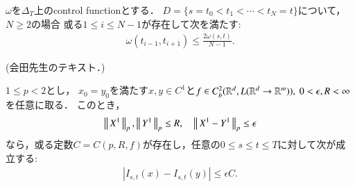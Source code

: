 	\begin{comment}
		\begin{align}
			&\omega_1(s,u)\omega_2(s,u) + \omega_1(u,t)\omega_2(u,t) \\
			&= \left\{ \omega_1(s,u) + \omega_1(u,t) \right\}\omega_2(s,u) + \omega_1(u,t)\left\{\omega_2(u,t) - \omega_2(s,u)\right\} \\
			&\leq \omega_1(s,t)\omega_2(s,u) + \omega_1(u,t)\left\{\omega_2(u,t) - \omega_2(s,u)\right\} \\
			&\leq \omega_1(s,t)\omega_2(s,u) + \omega_1(u,t)\omega_2(u,t) \\
			&\leq \omega_1(s,t)\left\{ \omega_2(s,u) + \omega_2(u,t)\right\} \\
			&\leq \omega_1(s,t)\omega_2(s,t)
		\end{align}
	\end{comment}
	
	\begin{screen}
		\begin{lem}\label{lem:control_function_min}
			$\omega$を$\Delta_T$上のcontrol functionとする．
			$D = \{s = t_0 < t_1 < \cdots < t_N= t\}$について，$N \geq 2$の場合
			或る$1 \leq i \leq N-1$が存在して次を満たす:
			\begin{align}
				\omega(t_{i-1},t_{i+1})
				\leq \frac{2 \omega(s,t)}{N-1}.
				\label{eq:lem_control_function_min}
			\end{align}
		\end{lem}
	\end{screen}
	
	\begin{prf}
		(会田先生のテキスト．)
		\QED
	\end{prf}
	
	\begin{screen}
		\begin{thm}\label{thm:continuity_theorem_1}
			$1 \leq p < 2$とし，
			$x_0 = y_0$を満たす$x,y \in C^1$と$f \in C^2_b(\mathbb{R}^d,L(\mathbb{R}^d \rightarrow \mathbb{R}^m)),\ 0 < \epsilon, R < \infty$を任意に取る．
			このとき，
			\begin{align}
				\left\|\, X^1\, \right\|_{p},\left\|\, Y^1\, \right\|_{p} \leq R,
				\quad \left\|\, X^1 - Y^1\, \right\|_{p} \leq \epsilon
			\end{align}
			なら，或る定数$C = C(p,R,f)$が存在し，任意の$0 \leq s \leq t \leq T$に対して次が成立する:
			\begin{align}
				\left| I_{s,t}(x) - I_{s,t}(y) \right| \leq \epsilon C.
			\end{align}
		\end{thm}
	\end{screen}
	

